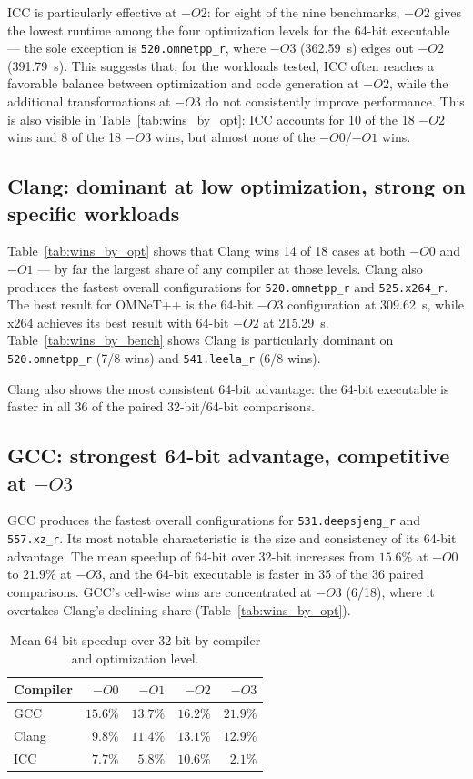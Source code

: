 \documentclass[11pt,a4paper]{article}
\newcommand{\bench}[1]{\texttt{#1}}
\begin{document}
ICC is particularly effective at $-O2$: for eight of the nine benchmarks,
$-O2$ gives the lowest runtime among the four optimization levels for the
64-bit executable --- the sole exception is \bench{520.omnetpp\_r}, where
$-O3$ (\SI{362.59}{s}) edges out $-O2$ (\SI{391.79}{s}). This suggests that,
for the workloads tested, ICC often reaches a favorable balance between
optimization and code generation at $-O2$, while the additional
transformations at $-O3$ do not consistently improve performance. This is
also visible in Table~\ref{tab:wins_by_opt}: ICC accounts for 10 of the 18
$-O2$ wins and 8 of the 18 $-O3$ wins, but almost none of the $-O0$/$-O1$
wins.

\subsection{Clang: dominant at low optimization, strong on specific workloads}

Table~\ref{tab:wins_by_opt} shows that Clang wins 14 of 18 cases at both
$-O0$ and $-O1$ --- by far the largest share of any compiler at those
levels. Clang also produces the fastest overall configurations for
\bench{520.omnetpp\_r} and \bench{525.x264\_r}. The best result for OMNeT++
is the 64-bit $-O3$ configuration at \SI{309.62}{s}, while x264 achieves its
best result with 64-bit $-O2$ at \SI{215.29}{s}. Table~\ref{tab:wins_by_bench}
shows Clang is particularly dominant on \bench{520.omnetpp\_r} (7/8 wins) and
\bench{541.leela\_r} (6/8 wins).

Clang also shows the most consistent 64-bit advantage: the 64-bit executable
is faster in all 36 of the paired 32-bit/64-bit comparisons.

\subsection{GCC: strongest 64-bit advantage, competitive at $-O3$}

GCC produces the fastest overall configurations for \bench{531.deepsjeng\_r} and
\bench{557.xz\_r}. Its most notable characteristic is the size and
consistency of its 64-bit advantage. The mean speedup of 64-bit over 32-bit
increases from $15.6\%$ at $-O0$ to $21.9\%$ at $-O3$, and the 64-bit
executable is faster in 35 of the 36 paired comparisons. GCC's cell-wise
wins are concentrated at $-O3$ (6/18), where it overtakes Clang's declining
share (Table~\ref{tab:wins_by_opt}).

\begin{table}[H]
\centering
\caption{Mean 64-bit speedup over 32-bit by compiler and optimization level.}
\label{tab:bitness}
\begin{tabular}{lrrrr}
\toprule
Compiler & $-O0$ & $-O1$ & $-O2$ & $-O3$ \\
\midrule
GCC   & $15.6\%$ & $13.7\%$ & $16.2\%$ & $21.9\%$ \\
Clang & $ 9.8\%$ & $11.4\%$ & $13.1\%$ & $12.9\%$ \\
ICC   & $ 7.7\%$ & $ 5.8\%$ & $10.6\%$ & $ 2.1\%$ \\
\bottomrule
\end{tabular}
\end{table}
\end{document}
